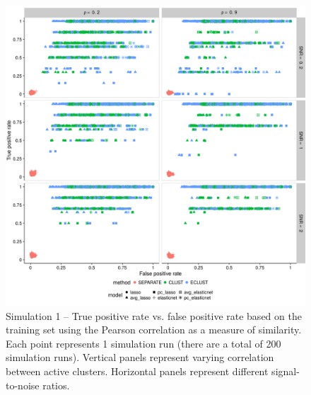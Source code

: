 \begin{appendices}
\begin{figure}
	\includegraphics[scale=0.6, keepaspectratio]{./figs/hydra/results/figures/sim1-sept10/tpr_fpr_Correlation_sim1.png}
	\caption{Simulation 1 -- True positive rate vs. false positive rate based on the training set using the Pearson correlation as a measure of similarity. Each point represents 1 simulation run (there are a total of 200 simulation runs). Vertical panels represent varying correlation between active clusters. Horizontal panels represent different signal-to-noise ratios.}
	\label{fig:tpr_fpr_Correlation_sim1}
\end{figure}



\end{appendices}
